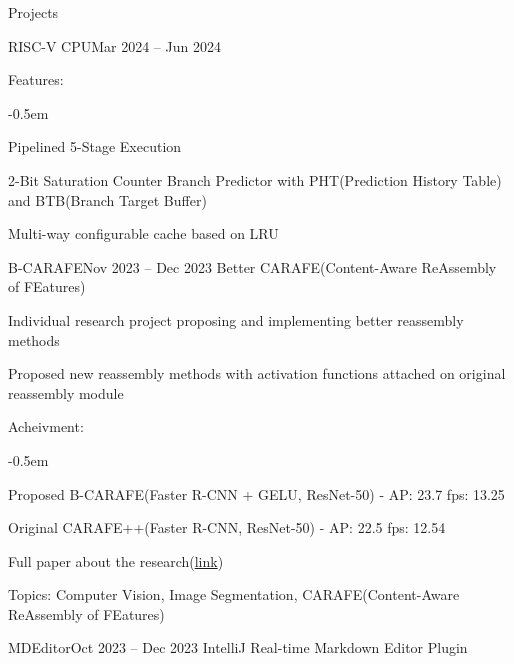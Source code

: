 \documentclass{resume}
\begin{document}
\begin{rSection}{Projects}
\begin{rSubsection}{RISC-V CPU}{Mar 2024 -- Jun 2024}
        \item Features:
        \vspace{-0.5em}
        \begin{list}{--}{\setlength{\rightmargin}{1.5em}}
            \itemsep -0.5em

            \item Pipelined 5-Stage Execution

            \item 2-Bit Saturation Counter Branch Predictor with PHT(Prediction History Table) and BTB(Branch Target Buffer)

            \item Multi-way configurable cache based on LRU
        \end{list}
    \end{rSubsection}

    \begin{rSubsection}{B-CARAFE}{Nov 2023 -- Dec 2023}
        Better CARAFE(Content-Aware ReAssembly of FEatures)

        \item Individual research project proposing and implementing better reassembly methods

        \item Proposed new reassembly methods with activation functions attached on original reassembly module

        \item Acheivment:
        \vspace{-0.5em}
        \begin{list}{--}{\setlength{\rightmargin}{1.5em}}
            \itemsep -0.5em

            \item Proposed B-CARAFE(Faster R-CNN + GELU, ResNet-50) - AP: 23.7 fps: 13.25

            \item Original CARAFE++(Faster R-CNN, ResNet-50) - AP: 22.5 fps: 12.54
        \end{list}

        \item Full paper about the research(\href{https://github.com/minsusun/csed539/blob/main/main.pdf}{link})

        \item Topics: Computer Vision, Image Segmentation, CARAFE(Content-Aware ReAssembly of FEatures)
    \end{rSubsection}

    \begin{rSubsection}{MDEditor}{Oct 2023 -- Dec 2023}
        IntelliJ Real-time Markdown Editor Plugin


\end{rSubsection}
\end{rSection}
\end{document}
